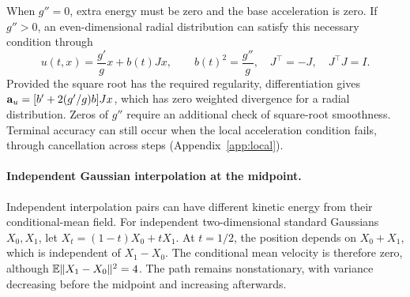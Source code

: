 When $g''=0$, extra energy must be zero and the base acceleration is zero. If $g''>0$, an even-dimensional radial distribution can satisfy this necessary condition through
\[
 u(t,x)=\frac{g'}g x+b(t)Jx,\qquad b(t)^2=\frac{g''}g,
 \quad J^\top=-J,\quad J^\top J=I.
\]
Provided the square root has the required regularity, differentiation gives $\mathbf a_u=[b'+2(g'/g)b]Jx$, which has zero weighted divergence for a radial distribution. Zeros of $g''$ require an additional check of square-root smoothness. Terminal accuracy can still occur when the local acceleration condition fails, through cancellation across steps (Appendix~\ref{app:local}).

\paragraph{Independent Gaussian interpolation at the midpoint.}
Independent interpolation pairs can have different kinetic energy from their conditional-mean field. For independent two-dimensional standard Gaussians $X_0,X_1$, let $X_t=(1-t)X_0+tX_1$. At $t=1/2$, the position depends on $X_0+X_1$, which is independent of $X_1-X_0$. The conditional mean velocity is therefore zero, although $\mathbb E\|X_1-X_0\|^2=4$. The path remains nonstationary, with variance decreasing before the midpoint and increasing afterwards.

